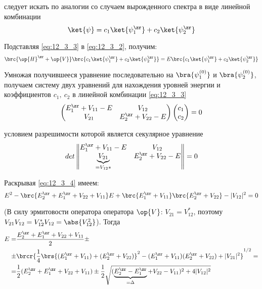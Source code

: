 следует искать по аналогии со случаем вырожденного спектра в виде линейной комбинации
\begin{equation}
\label{eq:12_3_3}
\ket{\psi} = c_1 \ket{\psi_1^\zr} + c_2 \ket{\psi_2^\zr} 
\end{equation}

Подставляя \eqref{eq:12_3_3} в \eqref{eq:12_3_2}, получим:
$$
\brc{\op{H}^\zr + \op{V}}\brc{c_1 \ket{\psi_1^\zr} + c_2 \ket{\psi_2^\zr}} = E \brc{c_1 \ket{\psi_1^\zr} + c_2 \ket{\psi_2^\zr}} \\
$$

Умножая получившееся уравнение последовательно на $\bra{\psi_1^{(0)}}$ и $\bra{\psi_2^{(0)}}$, получаем систему двух уравнений для нахождения уровней энергии и коэффициентов $c_1,~c_2$ в линейной комбинации \eqref{eq:12_3_3}
\begin{gather*}
  \begin{matrix}
    \begin{pmatrix}
      E_1^\zr + V_{11} - E & V_{12} \\
      V_{21} & E_2^\zr + V_{22} - E
    \end{pmatrix} 
    \begin{pmatrix}
      c_1\\
      c_2
    \end{pmatrix} 
     = 0
  \end{matrix}
\end{gather*}

условием разрешимости которой является секулярное уравнение
\begin{equation}
\label{eq:12_3_4}
det \left \| \begin{matrix}
E_1^\zr + V_{11} - E & V_{12} \\ 
\underbrace{V_{21}}_{=V_{12}*} & E_2^\zr + V_{22} - E
\end{matrix}
\right \| = 0
\end{equation}

Раскрывая \eqref{eq:12_3_4} имеем:
$$
E^2 - \brc{E_2^\zr + E_1^\zr + V_{22} + V_{11}}E + \brc{E_1^\zr + V_{11}} \brc{E_2^\zr + V_{22}} - |V_{12}|^2 = 0
$$

(В силу эрмитовости оператора оператора $\op{V}$: $V_{21} = V_{12}^*$, поэтому $V_{21}V_{12} = V_{12}^* V_{12} = \abs{V_{12}^2}$). Тогда
\begin{equation*}
\begin{split}
E = &  \frac{E_2^\zr + E_1^\zr + V_{22} + V_{11}}{2} \pm\\
\pm & \brcr{\frac{1}{4} \brs{ (E_1^\zr + V_{11}) + (E_2^\zr + V_{22}) }^2  - (E_1^\zr + V_{11})(E_2^\zr + V_{22}) + |V_{21}|^2 }^{1/2} = \\
= & \frac{1}{2}(E_2^\zr + E_1^\zr + V_{22} + V_{11}) \pm \frac{1}{2} \sqrt{(\underbrace{E_2^\zr -E_1^\zr}_{=\Delta} + V_{22} - V_{11})^2 + 4 |V_{12}|^2}
\end{split}
\end{equation*}

